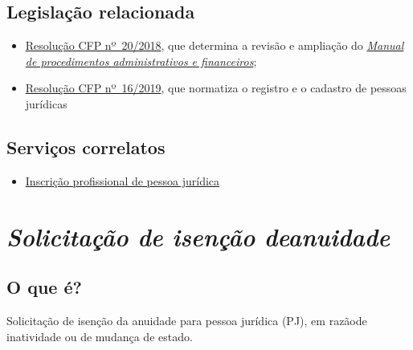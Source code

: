 \section{Legislação relacionada}

\begin{itemize}
  \item  \href{https://transparencia.cfp.org.br/wp-content/uploads/sites/7/2020/05/Manual-de-Procedimentos-Administrativos-e-Financeiro-CFP-RES-20.2018.pdf}{\href{https://atosoficiais.com.br/cfp/resolucao-administrativa-financeira-n-20-2018-altera-o-manual-de-procedimentos-administrativo-e-financeiro-do-sistema-conselhos-de-psicologia-anexo-da-resolucao-cfp-n-202018-a-resolucao-cfp-n-03-2007-a-resolucao-cfp-n-16-2019-e-da-outras-providencias}{Resolução  CFP nº~20/2018}}, que determina a revisão e ampliação do  \href{https://transparencia.cfp.org.br/wp-content/uploads/sites/7/2020/05/Manual-de-Procedimentos-Administrativos-e-Financeiro-CFP-RES-20.2018.pdf}{\emph{Manual  de procedimentos administrativos e financeiros}};
  \item  \href{https://atosoficiais.com.br/cfp/resolucao-administrativa-financeira-n-16-2019-altera-o-manual-de-procedimentos-administrativo-e-financeiro-do-sistema-conselhos-de-psicologia-anexo-da-resolucao-cfp-n-202018-a-resolucao-cfp-n-03-2007-a-resolucao-cfp-n-16-2019-e-da-outras-providencias}{Resolução  CFP nº~16/2019}, que normatiza o registro e o cadastro de pessoas  jurídicas
\end{itemize}

\section{Serviços correlatos}

\begin{itemize}
  \item  \hyperref[]{Inscrição  profissional de pessoa jurídica}
\end{itemize}

\chapter{\texorpdfstring{\emph{Solicitação de isenção deanuidade}}{Solicitação de isenção de anuidade}}


\section{O que é?}

Solicitação de isenção da anuidade para pessoa jurídica (PJ), em razãode inatividade ou de mudança de estado.

